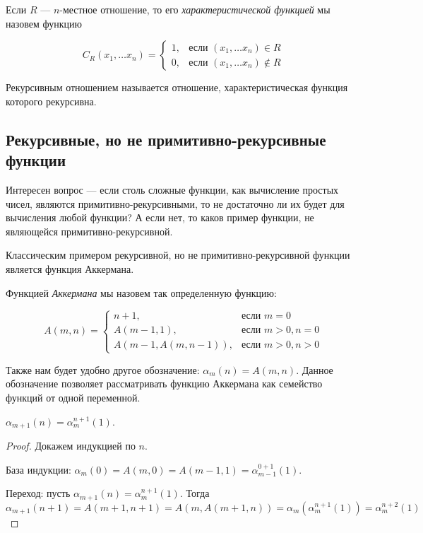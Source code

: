 \begin{definition}
Если $R$ --- $n$-местное отношение, то его \emph{характеристической функцией}
мы назовем функцию 

$$C_R(x_1,\dots x_n) = \left\{\begin{array}{rl}
    1, & \mbox{если $(x_1,\dots x_n) \in R$}\\
    0, & \mbox{если $(x_1,\dots x_n) \notin R$}
\end{array}\right.$$
\end{definition}

\begin{definition}
Рекурсивным отношением называется отношение, характеристическая функция
которого рекурсивна.
\end{definition}

\subsection{Рекурсивные, но не примитивно-рекурсивные функции}

Интересен вопрос --- если столь сложные функции, как вычисление простых
чисел, являются примитивно-рекурсивными, то не достаточно ли их будет
для вычисления любой функции? А если нет, то каков пример функции, не 
являющейся примитивно-рекурсивной.

Классическим примером рекурсивной, но не примитивно-рекурсивной функции 
является функция Аккермана.
                    
\begin{definition}Функцией \emph{Аккермана} мы назовем так определенную 
функцию:

$$A(m,n) = \left\{\begin{array}{rl}
   n+1, & \mbox{если $m = 0$}\\
   A(m-1,1), & \mbox{если $m > 0, n = 0$}\\
   A(m-1,A(m,n-1)), & \mbox{если $m > 0, n > 0$}
\end{array}\right.$$

Также нам будет удобно другое обозначение: $\alpha_m(n) = A(m,n)$. 
Данное обозначение позволяет рассматривать функцию Аккермана как семейство
функций от одной переменной.
\end{definition}

\begin{lemma}$\alpha_{m+1}(n) = \alpha^{n+1}_m(1)$.
\end{lemma}
\begin{proof}
Докажем индукцией по $n$. 

База индукции: $\alpha_m(0) = A(m,0) = A(m-1,1) = \alpha^{0+1}_{m-1}(1)$.

Переход: пусть $\alpha_{m+1}(n) = \alpha^{n+1}_m(1)$. Тогда 
$\alpha_{m+1}(n+1) = A(m+1,n+1) = A(m,A(m+1,n)) = \alpha_m(\alpha^{n+1}_m(1)) = 
\alpha^{n+2}_m(1)$
\end{proof}

